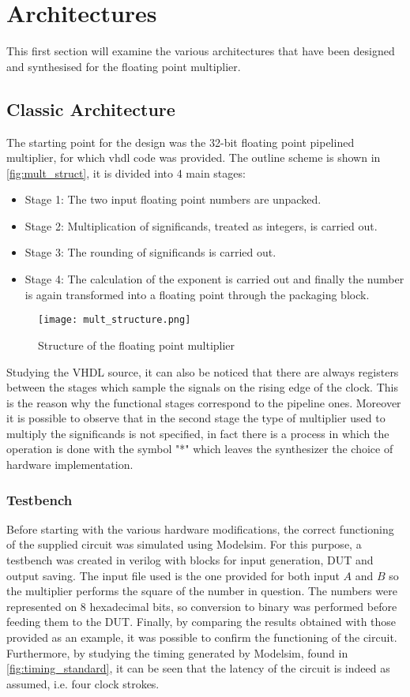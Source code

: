 \section{Architectures}
This first section will examine the various architectures that have been designed and synthesised for the floating point multiplier.

\subsection{Classic Architecture}
The starting point for the design was the 32-bit floating point pipelined multiplier, for which vhdl code was provided.
The outline scheme is shown in \autoref{fig:mult_struct}, it is divided into 4 main stages:
\begin{itemize}
\item Stage 1: The two input floating point numbers are unpacked.
\item Stage 2: Multiplication of significands, treated as integers, is carried out.
\item Stage 3: The rounding of significands is carried out.
\item Stage 4: The calculation of the exponent is carried out and finally the number is again transformed into a floating point through the packaging block.
\end{itemize}

\begin{figure}[h]
	\center
	\texttt{[image: mult\_structure.png]}
	\caption{Structure of the floating point multiplier}
	\label{fig:mult_struct}
\end{figure}

\noindent Studying the VHDL source, it can also be noticed that there are always registers between the stages which sample the signals on the rising edge of the clock. This is the reason why the functional stages correspond to the pipeline ones.
Moreover it is possible to observe that in the second stage the type of multiplier used to multiply the significands is not specified, in fact there is a process in which the operation is done with the symbol "*" which leaves the synthesizer the choice of hardware implementation.

\subsubsection{Testbench}
Before starting with the various hardware modifications, the correct functioning of the supplied circuit was simulated using Modelsim. For this purpose, a testbench was created in verilog with blocks for input generation, DUT and output saving.
The input file used is the one provided for both input $A$ and $B$ so the multiplier performs the square of the number in question. The numbers were represented on 8 hexadecimal bits, so conversion to binary was performed before feeding them to the DUT.
Finally, by comparing the results obtained with those provided as an example, it was possible to confirm the functioning of the circuit. Furthermore, by studying the timing generated by Modelsim, found in \autoref{fig:timing_standard}, it can be seen that the latency of the circuit is indeed as assumed, i.e. four clock strokes.

